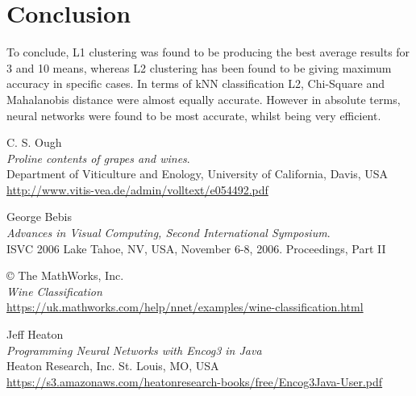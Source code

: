 \documentclass[10pt,twocolumn,letterpaper]{article}
\begin{document}
\section{Conclusion}

To conclude, L1 clustering was found to be producing the best average results for 3 and 10 means, whereas L2 clustering has been found to be giving maximum accuracy in specific cases. In terms of kNN classification L2, Chi-Square and Mahalanobis distance were almost equally accurate. However in absolute terms, neural networks were found to be most accurate, whilst being very efficient.

\begin{thebibliography}{9}
C. S. Ough\\
\textit{Proline contents of grapes and wines}. \\
Department of Viticulture and Enology, University of California, Davis, USA\\
\url{http://www.vitis-vea.de/admin/volltext/e054492.pdf}

George Bebis\\
\textit{Advances in Visual Computing, Second International Symposium}.\\
ISVC 2006 Lake Tahoe, NV, USA, November 6-8, 2006. Proceedings, Part II 

© The MathWorks, Inc.\\
\textit{Wine Classification}\\
\url{https://uk.mathworks.com/help/nnet/examples/wine-classification.html}

Jeff Heaton\\
\textit{Programming Neural Networks with Encog3 in Java}\\
Heaton Research, Inc. St. Louis, MO, USA\\
\url{https://s3.amazonaws.com/heatonresearch-books/free/Encog3Java-User.pdf}

\end{thebibliography}
\end{document}
